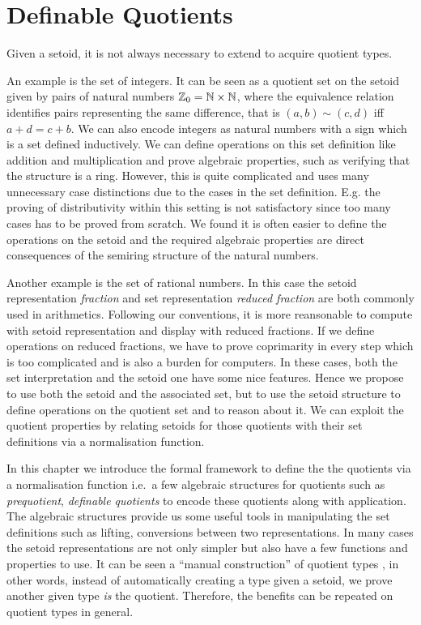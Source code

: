 \chapter{Definable Quotients}
\label{dq}



Given a setoid, it is not always necessary to extend \itt to acquire quotient types.

An example is the set of integers. It can be seen as a quotient set on
the setoid given by pairs of natural numbers
$\mathbb{Z}_0=\mathbb{N}\times\mathbb{N}$, where the equivalence relation identifies pairs
representing the same difference, that is  $(a,b)\sim(c,d)$ if{f}
$a+d=c+b$. 
We can also encode integers as natural 
numbers with a sign which is a set defined inductively.
We can define operations on this set definition like
addition and multiplication and prove algebraic properties,
such as verifying that the structure is a ring. 
However, this is quite complicated and uses many unnecessary case
distinctions due to the cases in the set definition. E.g. the proving of distributivity within this setting
is not satisfactory since too many cases has to be proved from
scratch. 
We found it is often easier to define the operations on the
setoid and the required algebraic properties are direct consequences
of the semiring structure of the natural numbers.

Another example is the set of rational numbers. In this case the setoid representation \emph{fraction} and set representation \emph{reduced fraction} are both commonly used in arithmetics. Following our conventions, it is more reansonable to compute with setoid representation and display with reduced fractions. If we define operations on reduced fractions, we have to prove coprimarity in every step which is too complicated and is also a burden for computers.
In these cases, both the set interpretation and the setoid one
have some nice features.
Hence we propose to use both the setoid
and the associated set, but to use the setoid structure to define
operations on the quotient set and to reason about it. We can exploit the quotient properties by relating setoids for those quotients with their set definitions via a normalisation function.


In this chapter we introduce the formal framework to define the
the quotients via a normalisation function i.e.\ a few algebraic structures for quotients such as \emph{prequotient}, \emph{definable quotients} to encode these quotients along with application.
The algebraic structures provide us some useful tools in manipulating the set definitions such as lifting, 
 conversions between two representations. In many cases the setoid representations are not only simpler but also have a few functions and properties to use. 
It can be seen a ``manual construction'' of quotient types
, in other words,
instead of automatically creating a type given a setoid, we
prove another given type \emph{is} the quotient. Therefore, the benefits can be repeated on quotient types in general.


